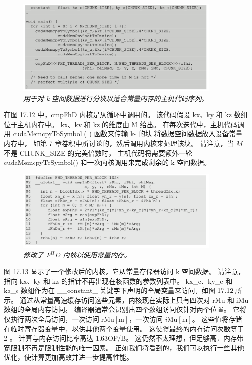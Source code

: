 \begin{figure}[H]
	\centering
	\includegraphics[width=0.9\textwidth]{figs/F17.12.png}
	\caption{\textit{用于对 k 空间数据进行分块以适合常量内存的主机代码序列。}}
\end{figure}

在图 17.12 中，cmpFhD 内核是从循环中调用的。 
该代码假设 $\mathrm{kx}、\mathrm{ky}$ 和 $\mathrm{kz}$ 数组位于主机内存中。 
$\mathrm{kx}、\mathrm{ky}$ 和 $\mathrm{kz}$ 的维度由 M 给出。
在每次迭代中，主机代码调用 cudaMemcpyToSymbol ( ) 函数来传输 k- 的块 将数据空间数据放入设备常量内存中，
如第 7 章卷积中所讨论的，然后调用内核来处理该块。 
请注意，当 $M$ 不是 CHUNK\_SIZE 的完美倍数时，
主机代码将需要额外一轮 cudaMemcpyToSymbol() 和一次内核调用来完成剩余的 k 空间数据。

\begin{figure}[H]
	\centering
	\includegraphics[width=0.9\textwidth]{figs/F17.13.png}
	\caption{\textit{修改了 $F^H D$ 内核以使用常量内存。}}
\end{figure}

图 17.13 显示了一个修改后的内核，它从常量存储器访问 k 空间数据。 
请注意，指向 $\mathrm{kx}$、ky 和 $\mathrm{kz}$ 的指针不再出现在核函数的参数列表中。 
kx\_c、ky\_c 和 kz\_c 数组作为在 \_\_constant\_ 关键字下声明的全局变量来访问，如图 17.12 所示。 
通过从常量高速缓存访问这些元素，内核现在实际上只有四次对 rMu 和 iMu 数组的全局内存访问。 
编译器通常会识别出四个数组访问仅针对两个位置。 
它将仅执行两次全局访问，一次访问 $\mathrm{rMu}[\mathrm{m}]$，一次访问 $i \mathrm{Mu}[\mathrm{m}]$。 
这些值将存储在临时寄存器变量中，以供其他两个变量使用。 这使得最终的内存访问次数等于 2 。 
计算与内存访问比率高达 $1.63 \mathrm{OP} / \mathrm{B}$。 
这仍然不太理想，但足够高，内存带宽限制不再是限制性能的唯一因素。 
正如我们将看到的，我们可以执行一些其他优化，使计算更加高效并进一步提高性能。


